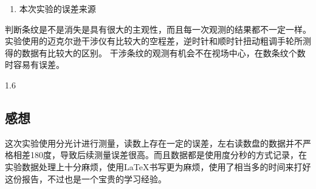 \documentclass[a4paper]{article}
\begin{document}
\begin{changemargin}{1cm}{1cm}
\begin{spacing}{1.6}
\begin{enumerate}
            \item 本次实验的误差来源
        \end{enumerate}



        判断条纹是不是消失是具有很大的主观性，而且每一次观测的结果都不一定一样。
        实验使用的迈克尔逊干涉仪有比较大的空程差，逆时针和顺时针扭动粗调手轮所测得的数据有比较大的区别。
        干涉条纹的观测有机会不在视场中心，在数条纹个数时容易有误差。

    \end{spacing}{1.6}
    \subsection{感想}
    \begin{spacing}{1.6}
        这次实验使用分光计进行测量，读数上存在一定的误差，左右读数盘的数据并不严格相差180度，导致后续测量误差很高。而且数据都是使用度分秒的方式记录，在实验数据处理上十分麻烦，使用LaTeX书写更为麻烦，使用了相当多的时间来打好这份报告，不过也是一个宝贵的学习经验。
    \end{spacing}










\end{changemargin}
\end{document}
